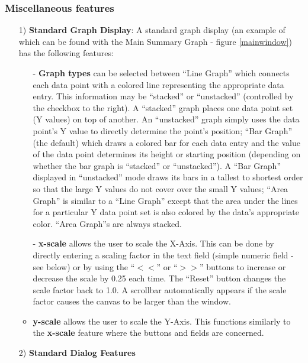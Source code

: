 \documentclass[10pt]{article}
\begin{document}



\subsubsection{Miscellaneous features}
\label{sec::misc}

\begin{itemize}
\item[1)] 
{\bf Standard Graph Display}: A standard graph display (an
example of which can be found with the Main Summary Graph - figure
\ref{mainwindow}) has the following features:

\begin{itemize}
\item[-] {\bf Graph types} can be selected between ``Line Graph'' which
connects each data point with a colored line representing the
appropriate data entry. This information may be ``stacked'' or
``unstacked'' (controlled by the checkbox to the right). A ``stacked''
graph places one data point set (Y values) on top of another. An
``unstacked'' graph simply uses the data point's Y value to directly
determine the point's position; ``Bar Graph'' (the default) which
draws a colored bar for each data entry and the value of the data
point determines its height or starting position (depending on whether
the bar graph is ``stacked'' or ``unstacked''). A ``Bar Graph''
displayed in ``unstacked'' mode draws its bars in a tallest to
shortest order so that the large Y values do not cover over the small
Y values; ``Area Graph'' is similar to a ``Line Graph'' except that the
area under the lines for a particular Y data point set is also colored
by the data's appropriate color. ``Area Graph''s are always stacked.
\item[-] {\bf x-scale} allows the user to scale the X-Axis. This can be
done by directly entering a scaling factor in the text field (simple
numeric field - see below) or by using the ``$<<$'' or ``$>>$'' buttons
to increase or decrease the scale by 0.25 each time. The ``Reset'' button
changes the scale factor back to 1.0. A scrollbar automatically appears
if the scale factor causes the canvas to be larger than the window.
\item {\bf y-scale} allows the user to scale the Y-Axis. This functions 
similarly to the {\bf x-scale} feature where the buttons and fields are
concerned.
\end{itemize}

\item[2)]
{\bf Standard Dialog Features}


\end{itemize}
\end{document}
